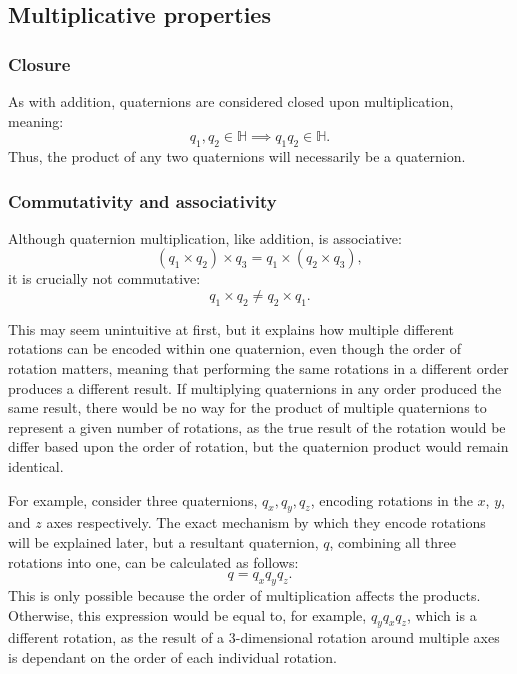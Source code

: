 \documentclass[10pt]{article}
\begin{document}
\subsection{Multiplicative properties}

\subsubsection{Closure}

As with addition, quaternions are considered closed upon multiplication, meaning:
\begin{equation}
    q_1, q_2 \in \mathbb{H} \implies q_1q_2 \in \mathbb{H}.
\end{equation}
Thus, the product of any two quaternions will necessarily be a quaternion. \cite{Illinois}

\subsubsection{Commutativity and associativity} \label{ComAss}

Although quaternion multiplication, like addition, is associative: \cite{Illinois}
\begin{equation}
    (q_1 \times q_2) \times q_3 = q_1 \times (q_2 \times q_3),
\end{equation}
it is crucially not commutative: \cite{Math431}
\begin{equation}
    q_1 \times q_2 \neq q_2 \times q_1.
\end{equation}

This may seem unintuitive at first, but it explains how multiple different rotations can be encoded within one quaternion, even though the order of rotation matters, meaning that performing the same rotations in a different order produces a different result. If multiplying quaternions in any order produced the same result, there would be no way for the product of multiple quaternions to represent a given number of rotations, as the true result of the rotation would be differ based upon the order of rotation, but the quaternion product would remain identical.

For example, consider three quaternions, $q_x, q_y, q_z$, encoding rotations in the $x$, $y$, and $z$ axes respectively. The exact mechanism by which they encode rotations will be explained later, but a resultant quaternion, $q$, combining all three rotations into one, can be calculated as follows:
\begin{equation}
    q = q_xq_yq_z.
\end{equation}
This is only possible because the order of multiplication affects the products. Otherwise, this expression would be equal to, for example, $q_yq_xq_z$, which is a different rotation, as the result of a 3-dimensional rotation around multiple axes is dependant on the order of each individual rotation.
\end{document}
